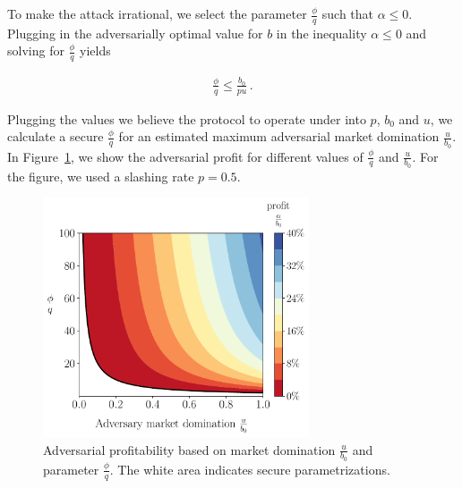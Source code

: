 To make the attack irrational, we select
the parameter $\frac{\phi}{q}$ such that $\alpha \leq 0$.
Plugging in the adversarially optimal value for $b$ in the inequality $\alpha \leq 0$ and solving
for $\frac{\phi}{q}$ yields

\begin{gather*}
  \frac{\phi}{q} \leq \frac{b_0}{p u}\,. \label{eq:phi-choice} \tag{$\ast$}
\end{gather*}

%



Plugging the values we believe the protocol to operate under into
$p$, $b_0$ and $u$, we calculate a secure
$\frac{\phi}{q}$ for an estimated maximum adversarial market domination $\frac{u}{b_0}$.
In Figure~\ref{fig:contour-plotu}, we show the adversarial profit for
different values of $\frac{\phi}{q}$ and $\frac{u}{b_0}$.
For the figure, we used a slashing rate $p = 0.5$.


\begin{figure}[htb]
  \centering
  \includegraphics[width=0.7\textwidth]{./plots/plotu.pdf}
  \caption{Adversarial profitability based on market domination
            $\frac{u}{b_0}$ and parameter $\frac{\phi}{q}$.
            The white area indicates secure parametrizations.}
  \label{fig:contour-plotu}
\end{figure}


